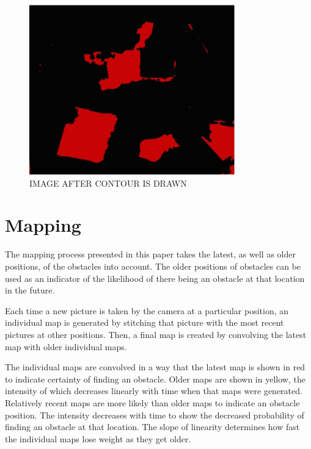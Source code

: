 \documentclass[twocolumn,10pt]{asme2e}
\begin{document}
\begin{figure}[t]
\begin{center}
\includegraphics[width=3.5in]{contour}
\caption{IMAGE AFTER CONTOUR IS DRAWN}
\label{default}
\end{center}
\end{figure}


\section*{Mapping}
The mapping process presented in this paper takes the latest, as well as older positions, of the obstacles into account. The older positions of obstacles can be used as an indicator of the likelihood of there being an obstacle at that location in the future.

Each time a new picture is taken by the camera at a particular position, an individual map is generated by stitching that picture with the most recent pictures at other positions. Then, a final map is created by convolving the latest map with older individual maps. 


The individual maps are convolved in a way that the latest map is shown in red to indicate certainty of finding an obstacle. Older maps are shown in yellow, the intensity of which decreases linearly with time when that maps were generated. Relatively recent maps are more likely than older maps to indicate an obstacle position. The intensity decreases with time to show the decreased probability of finding an obstacle at that location. The slope of linearity determines how fast the individual maps lose weight as they get older.
\end{document}
